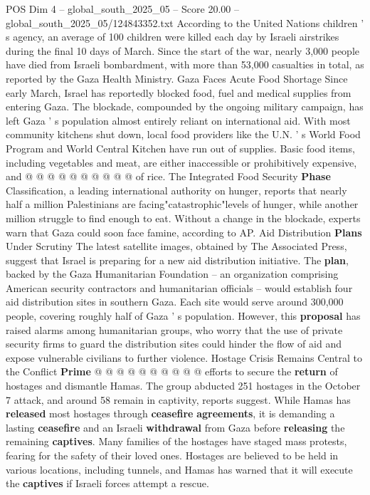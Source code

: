 \begin{textsample}{POS Dim 4 – global\_south\_2025\_05 – Score 20.00 – global\_south\_2025\_05/124843352.txt}
According to the United Nations children ' s agency, an average of 100 children were killed each day by Israeli airstrikes during the final 10 days of March.
Since the start of the war, nearly 3,000 people have died from Israeli bombardment, with more than 53,000 casualties in total, as reported by the Gaza Health Ministry.
Gaza Faces Acute Food Shortage Since early March, Israel has reportedly blocked food, fuel and medical supplies from entering Gaza.
The blockade, compounded by the ongoing military campaign, has left Gaza ' s population almost entirely reliant on international aid.
With most community kitchens shut down, local food providers like the U.N. ' s World Food Program and World Central Kitchen have run out of supplies.
Basic food items, including vegetables and meat, are either inaccessible or prohibitively expensive, and @ @ @ @ @ @ @ @ @ @ of rice.
The Integrated Food Security \textbf{Phase} Classification, a leading international authority on hunger, reports that nearly half a million Palestinians are facing"catastrophic"levels of hunger, while another million struggle to find enough to eat.
Without a change in the blockade, experts warn that Gaza could soon face famine, according to AP.
Aid Distribution \textbf{Plans} Under Scrutiny The latest satellite images, obtained by The Associated Press, suggest that Israel is preparing for a new aid distribution initiative.
The \textbf{plan}, backed by the Gaza Humanitarian Foundation -- an organization comprising American security contractors and humanitarian officials -- would establish four aid distribution sites in southern Gaza.
Each site would serve around 300,000 people, covering roughly half of Gaza ' s population.
However, this \textbf{proposal} has raised alarms among humanitarian groups, who worry that the use of private security firms to guard the distribution sites could hinder the flow of aid and expose vulnerable civilians to further violence.
Hostage Crisis Remains Central to the Conflict \textbf{Prime} @ @ @ @ @ @ @ @ @ @ efforts to secure the \textbf{return} of hostages and dismantle Hamas.
The group abducted 251 hostages in the October 7 attack, and around 58 remain in captivity, reports suggest.
While Hamas has \textbf{released} most hostages through \textbf{ceasefire} \textbf{agreements}, it is demanding a lasting \textbf{ceasefire} and an Israeli \textbf{withdrawal} from Gaza before \textbf{releasing} the remaining \textbf{captives}.
Many families of the hostages have staged mass protests, fearing for the safety of their loved ones.
Hostages are believed to be held in various locations, including tunnels, and Hamas has warned that it will execute the \textbf{captives} if Israeli forces attempt a rescue.

\end{textsample}
